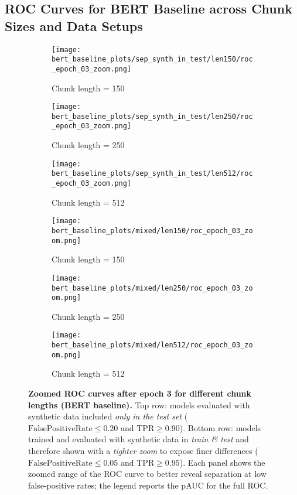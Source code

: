 \subsection{ROC Curves for BERT Baseline across Chunk Sizes and Data Setups}


\begin{figure}[H]
  \centering

  \begin{subfigure}[t]{0.32\textwidth}
    \centering
    \texttt{[image: bert\_baseline\_plots/sep\_synth\_in\_test/len150/roc\_epoch\_03\_zoom.png]}
    \caption{Chunk length = 150}
  \end{subfigure}\hfill
  \begin{subfigure}[t]{0.32\textwidth}
    \centering
    \texttt{[image: bert\_baseline\_plots/sep\_synth\_in\_test/len250/roc\_epoch\_03\_zoom.png]}
    \caption{Chunk length = 250}
  \end{subfigure}\hfill
  \begin{subfigure}[t]{0.32\textwidth}
    \centering
    \texttt{[image: bert\_baseline\_plots/sep\_synth\_in\_test/len512/roc\_epoch\_03\_zoom.png]}
    \caption{Chunk length = 512}
  \end{subfigure}

  \vspace{0.45cm}
  \begin{subfigure}[t]{0.32\textwidth}
    \centering
    \texttt{[image: bert\_baseline\_plots/mixed/len150/roc\_epoch\_03\_zoom.png]}
    \caption{Chunk length = 150}
  \end{subfigure}\hfill
  \begin{subfigure}[t]{0.32\textwidth}
    \centering
    \texttt{[image: bert\_baseline\_plots/mixed/len250/roc\_epoch\_03\_zoom.png]}
    \caption{Chunk length = 250}
  \end{subfigure}\hfill
  \begin{subfigure}[t]{0.32\textwidth}
    \centering
    \texttt{[image: bert\_baseline\_plots/mixed/len512/roc\_epoch\_03\_zoom.png]}
    \caption{Chunk length = 512}
  \end{subfigure}

  \caption[Zoomed ROC curves after epoch 3 for different chunk lengths.]{\textbf{Zoomed ROC curves after epoch 3 for different chunk lengths (BERT baseline).}
  Top row: models evaluated with synthetic data included \emph{only in the test set} (\(\mathrm{False Positive Rate}\le 0.20\) and \(\mathrm{TPR}\ge 0.90\)). 
  Bottom row: models trained and evaluated with synthetic data in \emph{train \& test} and therefore shown with a \emph{tighter zoom} to expose finer differences (\(\mathrm{False Positive Rate}\le 0.05\) and \(\mathrm{TPR}\ge 0.95\)). 
  Each panel shows the zoomed range of the ROC curve to better reveal separation at low false-positive rates; the legend reports the pAUC for the full ROC.}
  \label{fig:roc_zoom_epoch3}
\end{figure}

